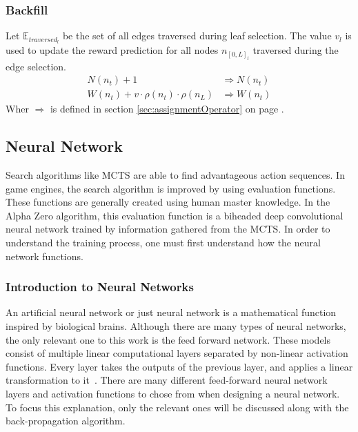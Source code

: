 \documentclass[12pt]{article}
\newcommand{\sectionref}[1]{section \ref{#1} on page \pageref{#1}}
\begin{document}
\subsubsection{Backfill}
\label{sec:Methods:MCTS:Backfill}
Let \(\mathbb E_{traversed}_l\) be the set of all edges traversed during leaf selection.
The value \(v_l\) is used to update the reward prediction for all nodes \(n_{[0, L]_l}\) traversed during the edge selection. 
\begin{align}
N(n_t) + 1 &\Rightarrow N(n_t)\\
W(n_t) + v \cdot \rho(n_t) \cdot \rho(n_L) &\Rightarrow W(n_t)
\end{align}
Wher \(\Rightarrow\) is defined in \sectionref{sec:assignmentOperator}.

\subsection{Neural Network}
Search algorithms like MCTS are able to find advantageous action sequences. In game engines, the search algorithm is improved by using evaluation functions. These functions are generally created using human master knowledge. In the Alpha Zero algorithm, this evaluation function is a biheaded deep convolutional neural network trained by information gathered from the MCTS. In order to understand the training process, one must first understand how the neural network functions.
\label{NN}
\subsubsection{Introduction to Neural Networks}
An artificial neural network or just neural network is a mathematical function inspired by biological brains. Although there are many types of neural networks, the only relevant one to this work is the feed forward network. These models consist of multiple linear computational layers separated by non-linear activation functions. Every layer takes the outputs of the previous layer, and applies a linear transformation to it~\cite{zhang2018artificial}. There are many different feed-forward neural network layers and activation functions to chose from when designing a neural network. To focus this explanation, only the relevant ones will be discussed along with the back-propagation algorithm.
\end{document}
